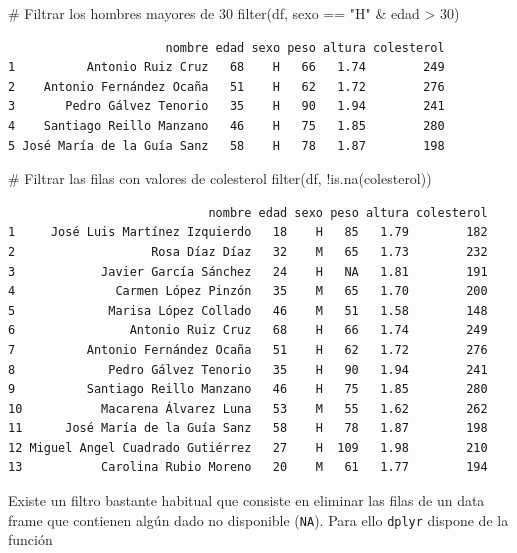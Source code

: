 \documentclass[
  a4paper,
]{scrreport}
\newenvironment{Shaded}{\begin{snugshade}}{\end{snugshade}}
\newcommand{\CommentTok}[1]{\textcolor[rgb]{0.37,0.37,0.37}{#1}}
\newcommand{\DecValTok}[1]{\textcolor[rgb]{0.68,0.00,0.00}{#1}}
\newcommand{\FunctionTok}[1]{\textcolor[rgb]{0.28,0.35,0.67}{#1}}
\newcommand{\NormalTok}[1]{\textcolor[rgb]{0.00,0.23,0.31}{#1}}
\newcommand{\SpecialCharTok}[1]{\textcolor[rgb]{0.37,0.37,0.37}{#1}}
\newcommand{\StringTok}[1]{\textcolor[rgb]{0.13,0.47,0.30}{#1}}
\theoremstyle{definition}
\theoremstyle{definition}
\theoremstyle{remark}
\begin{document}
\begin{Shaded}
\begin{Highlighting}[]
\CommentTok{\# Filtrar los hombres mayores de 30 }
\FunctionTok{filter}\NormalTok{(df, sexo }\SpecialCharTok{==} \StringTok{"H"} \SpecialCharTok{\&}\NormalTok{ edad }\SpecialCharTok{\textgreater{}} \DecValTok{30}\NormalTok{)}
\end{Highlighting}
\end{Shaded}

\begin{verbatim}
                      nombre edad sexo peso altura colesterol
1          Antonio Ruiz Cruz   68    H   66   1.74        249
2    Antonio Fernández Ocaña   51    H   62   1.72        276
3       Pedro Gálvez Tenorio   35    H   90   1.94        241
4    Santiago Reillo Manzano   46    H   75   1.85        280
5 José María de la Guía Sanz   58    H   78   1.87        198
\end{verbatim}

\begin{Shaded}
\begin{Highlighting}[]
\CommentTok{\# Filtrar las filas con valores de colesterol}
\FunctionTok{filter}\NormalTok{(df, }\SpecialCharTok{!}\FunctionTok{is.na}\NormalTok{(colesterol))}
\end{Highlighting}
\end{Shaded}

\begin{verbatim}
                            nombre edad sexo peso altura colesterol
1     José Luis Martínez Izquierdo   18    H   85   1.79        182
2                   Rosa Díaz Díaz   32    M   65   1.73        232
3            Javier García Sánchez   24    H   NA   1.81        191
4              Carmen López Pinzón   35    M   65   1.70        200
5             Marisa López Collado   46    M   51   1.58        148
6                Antonio Ruiz Cruz   68    H   66   1.74        249
7          Antonio Fernández Ocaña   51    H   62   1.72        276
8             Pedro Gálvez Tenorio   35    H   90   1.94        241
9          Santiago Reillo Manzano   46    H   75   1.85        280
10           Macarena Álvarez Luna   53    M   55   1.62        262
11      José María de la Guía Sanz   58    H   78   1.87        198
12 Miguel Angel Cuadrado Gutiérrez   27    H  109   1.98        210
13           Carolina Rubio Moreno   20    M   61   1.77        194
\end{verbatim}

Existe un filtro bastante habitual que consiste en eliminar las filas de
un data frame que contienen algún dado no disponible (\texttt{NA}). Para
ello \texttt{dplyr} dispone de la función
\end{document}
